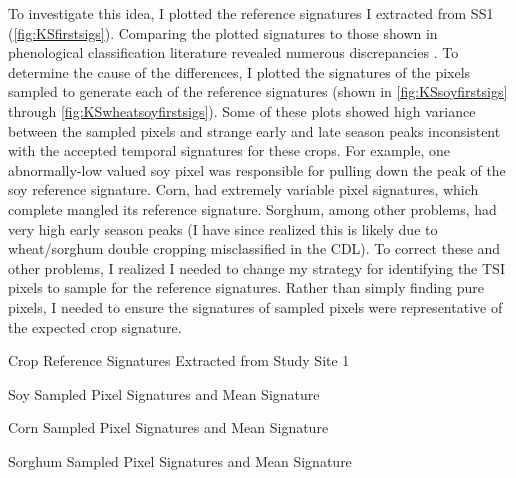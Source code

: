 To investigate this idea, I plotted the reference signatures I extracted from SS1 (\autoref{fig:KSfirstsigs}). Comparing the plotted signatures to those shown in phenological classification literature  revealed numerous discrepancies \autocites{wardlow2002discriminating}{wardlow2005state-level}{wardlow2007analysis}{wardlow2008large-area}{masialeti2010a-comparative}. To determine the cause of the differences, I plotted the signatures of the pixels sampled to generate each of the reference signatures (shown in \autoref{fig:KSsoyfirstsigs} through \autoref{fig:KSwheatsoyfirstsigs}). Some of these plots showed high variance between the sampled pixels and strange early and late season peaks inconsistent with the accepted temporal signatures for these crops. For example, one abnormally-low valued soy pixel was responsible for pulling down the peak of the soy reference signature. Corn, had extremely variable pixel signatures, which complete mangled its reference signature. Sorghum, among other problems, had very high early season peaks (I have since realized this is likely due to wheat/sorghum double cropping misclassified in the CDL). To correct these and other problems, I realized I needed to change my strategy for identifying the TSI pixels to sample for the reference signatures. Rather than simply finding pure pixels, I needed to ensure the signatures of sampled pixels were representative of the expected crop signature.

\begin{ssfigure}
  \centering
  
  \caption{Crop Reference Signatures Extracted from Study Site 1}
  \label{fig:KSfirstsigs}
\end{ssfigure}

\begin{ssfigure}
  \centering
  
  \caption{Soy Sampled Pixel Signatures and Mean Signature}
    \label{fig:KSsoyfirstsigs}
\end{ssfigure}

\begin{ssfigure}
  \centering
  
  \caption{Corn Sampled Pixel Signatures and Mean Signature}
    \label{fig:KScornfirstsigs}
\end{ssfigure}

\begin{ssfigure}
  \centering
  
  \caption{Sorghum Sampled Pixel Signatures and Mean Signature}
    \label{fig:KSsorghumfirstsigs}
\end{ssfigure}

